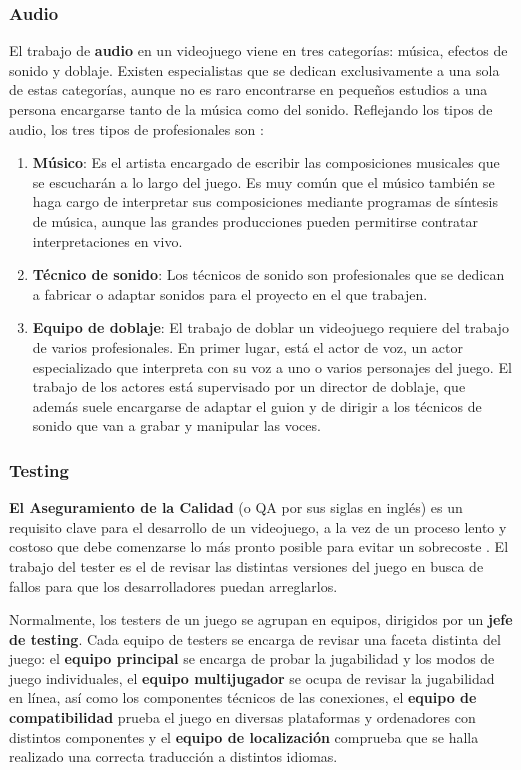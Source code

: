 \subsubsection{Audio}
El trabajo de \textbf{audio} en un videojuego viene en tres categorías: música, efectos de sonido y doblaje. Existen especialistas que se dedican exclusivamente a una sola de estas categorías, aunque no es raro encontrarse en pequeños estudios a una persona encargarse tanto de la música como del sonido. Reflejando los tipos de audio, los tres tipos de profesionales son \cite{development_and_production}:
\begin{enumerate}
\item \textbf{Músico}: Es el artista encargado de escribir las composiciones musicales que se escucharán a lo largo del juego. Es muy común que el músico también se haga cargo de interpretar sus composiciones mediante programas de síntesis de música, aunque las grandes producciones pueden permitirse contratar interpretaciones en vivo.
\item \textbf{Técnico de sonido}: Los técnicos de sonido son profesionales que se dedican a fabricar o adaptar sonidos para el proyecto en el que trabajen.
\item \textbf{Equipo de doblaje}: El trabajo de doblar un videojuego requiere del trabajo de varios profesionales. En primer lugar, está el actor de voz, un actor especializado que interpreta con su voz a uno o varios personajes del juego. El trabajo de los actores está supervisado por un director de doblaje, que además suele encargarse de adaptar el guion y de dirigir a los técnicos de sonido que van a grabar y manipular las voces.
\end{enumerate}

\subsubsection{Testing}
\textbf{El Aseguramiento de la Calidad} (o QA por sus siglas en inglés) es un requisito clave para el desarrollo de un videojuego, a la vez de un proceso lento y costoso que debe comenzarse lo más pronto posible para evitar un sobrecoste \cite{development_and_production}. El trabajo del tester es el de revisar las distintas versiones del juego en busca de fallos para que los desarrolladores puedan arreglarlos.

Normalmente, los testers de un juego se agrupan en equipos, dirigidos por un \textbf{jefe de testing}. Cada equipo de testers se encarga de revisar una faceta distinta del juego: el \textbf{equipo principal} se encarga de probar la jugabilidad y los modos de juego individuales, el \textbf{equipo multijugador} se ocupa de revisar la jugabilidad en línea, así como los componentes técnicos de las conexiones, el \textbf{equipo de compatibilidad} prueba el juego en diversas plataformas y ordenadores con distintos componentes y el \textbf{equipo de localización} comprueba que se halla realizado una correcta traducción a distintos idiomas.


